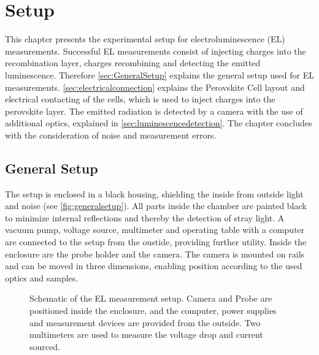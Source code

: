 \chapter{Setup}
This chapter presents the experimental setup for electroluminescence (EL) measurements. Successful EL measurements consist of injecting charges into the recombination layer, charges recombining and detecting the emitted luminescence. Therefore \autoref{sec:GeneralSetup} explains the general setup used for EL measurements. \autoref{sec:electricalconnection} explains the Perovskite Cell layout and electrical contacting of the cells, which is used to inject charges into the perovskite layer. The emitted radiation is detected by a camera with the use of additional optics,  explained in \autoref{sec:luminescencedetection}. The chapter concludes with the consideration of noise and measurement errors.

\section{General Setup}\label{sec:GeneralSetup}
The setup is enclosed in a black housing, shielding the inside from outside light and noise (see \autoref{fig:generalsetup}). All parts inside the chamber are painted black to minimize internal reflections and thereby the detection of stray light. A vacuum pump, voltage source, multimeter and operating table with a computer are connected to the setup from the oustide, providing further utility. Inside the enclosure are the probe holder and the camera. The camera is mounted on rails and can be moved in three dimensions, enabling position according to the used optics and samples.
\begin{figure}[h]
	\centering
	
	\caption{Schematic of the EL measurement setup. Camera and Probe are positioned inside the enclosure, and the computer, power supplies and measurement devices are provided from the outside. Two multimeters are used to measure the voltage drop and current sourced.}
	\label{fig:generalsetup}
\end{figure}
\FloatBarrier
